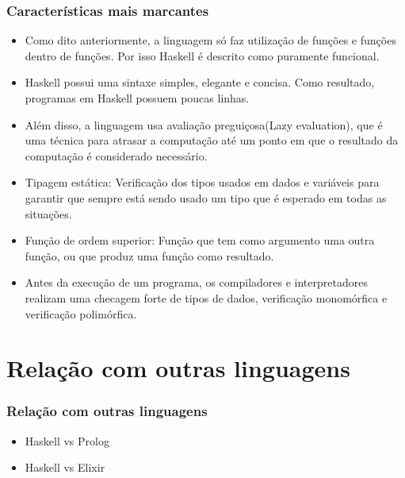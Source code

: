 \documentclass[aspectratio=169]{beamer}
\begin{document}
    \begin{frame}
      \frametitle{Características mais marcantes}

      \begin{itemize}
        \item Como dito anteriormente, a linguagem só faz utilização de funções e funções dentro de funções. Por isso
        Haskell é descrito como puramente funcional. 
        \item Haskell possui uma sintaxe simples, elegante e concisa. Como resultado, programas em Haskell possuem 
        poucas linhas. 
        \item Além disso, a linguagem usa avaliação preguiçosa(Lazy evaluation), que é uma técnica para atrasar a computação 
        até um ponto em que o resultado da computação é considerado necessário.
        \item Tipagem estática: Verificação dos tipos usados em dados e variáveis para 
        garantir que sempre está sendo usado um tipo que é esperado em todas as situações. 
        \item Função de ordem superior: Função que tem como argumento uma outra função, ou que produz 
        uma função como resultado.
        \item Antes da execução de um programa, os compiladores e interpretadores realizam uma checagem forte de tipos
        de dados, verificação monomórfica e verificação polimórfica.
      \end{itemize}

    \end{frame}


    \section{Relação com outras linguagens}

    \begin{frame}
      \frametitle{Relação com outras linguagens}

      \begin{itemize}
        \item Haskell vs Prolog
        \item Haskell vs Elixir
      \end{itemize}

    \end{frame}
\end{document}
